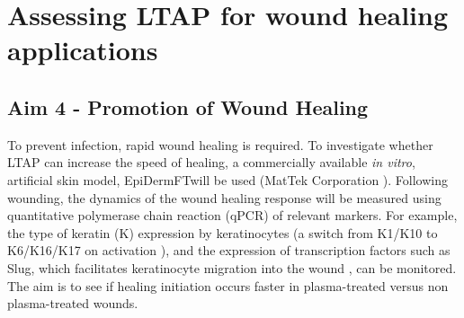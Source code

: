 \documentclass[11pt, oneside]{article}   	%
\begin{document}


\section*{Assessing LTAP for wound healing applications}







\subsection*{Aim 4 - Promotion of Wound Healing}
To prevent infection, rapid wound healing is required.
To investigate whether LTAP can increase the speed of healing, a commercially available \textit{in vitro}, artificial skin model, EpiDermFT\texttrademark will be used (MatTek Corporation \cite{MattekWebsite}). 
Following wounding, the dynamics of the wound healing response will be measured using quantitative polymerase chain reaction (qPCR) of relevant markers.
For example, the type of keratin (K) expression by keratinocytes (a switch from K1/K10 to K6/K16/K17 on activation \cite{Pastar2014epithelialization}), and the expression of transcription factors such as Slug, which facilitates keratinocyte migration into the wound \cite{Savagner2005}, can be monitored.
The aim is to see if healing initiation occurs faster in plasma-treated versus non plasma-treated wounds. 
\end{document}
